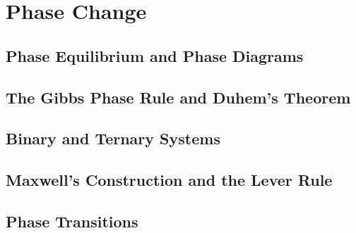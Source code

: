\chapter{Phase Change}
\section{Phase Equilibrium and Phase Diagrams}
\section{The Gibbs Phase Rule and Duhem's Theorem}
\section{Binary and Ternary Systems}
\section{Maxwell's Construction and the Lever Rule}
\section{Phase Transitions}
